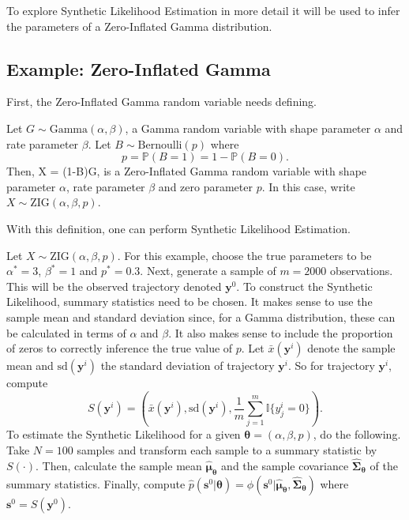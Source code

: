 To explore Synthetic Likelihood Estimation in more detail it will be used to infer the parameters of a Zero-Inflated Gamma distribution.

\subsection{Example: Zero-Inflated Gamma}
\label{subsec:gamma}

First, the Zero-Inflated Gamma random variable needs defining.

\begin{definition}
    Let $G \sim \text{Gamma}(\alpha, \beta)$, a Gamma random variable with shape parameter $\alpha$ and rate parameter $\beta$. Let $B \sim \text{Bernoulli}(p)$ where
    \[ p = \mathbb{P}(B = 1) = 1 - \mathbb{P}(B = 0). \]
    Then, X = (1-B)G, is a Zero-Inflated Gamma random variable with shape parameter $\alpha$, rate parameter $\beta$ and zero parameter $p$. In this case, write $X \sim \text{ZIG}(\alpha, \beta, p)$.
\end{definition}

With this definition, one can perform Synthetic Likelihood Estimation.

Let $X \sim \text{ZIG}(\alpha, \beta, p)$. For this example, choose the true parameters to be $\alpha^* = 3$, $\beta^* = 1$ and $p^* = 0.3$. Next, generate a sample of $m = 2000$ observations. This will be the observed trajectory denoted $\pmb{y}^0$. To construct the Synthetic Likelihood, summary statistics need to be chosen. It makes sense to use the sample mean and standard deviation since, for a Gamma distribution, these can be calculated in terms of $\alpha$ and $\beta$. It also makes sense to include the proportion of zeros to correctly inference the true value of $p$. Let $\bar{x}(\pmb{y}^i)$ denote the sample mean and $\text{sd}(\pmb{y}^i)$ the standard deviation of trajectory $\pmb{y}^i$. So for trajectory $\pmb{y}^i$, compute
\begin{equation}
S(\pmb{y}^i) = (\bar{x}(\pmb{y}^i), \text{sd}(\pmb{y}^i), \frac{1}{m}\sum_{j=1}^m \mathbb{I}\{y^i_j = 0\}).
\end{equation}
To estimate the Synthetic Likelihood for a given $\pmb{\theta} = (\alpha, \beta, p)$, do the following. Take $N=100$ samples and transform each sample to a summary statistic by $S(\cdot)$. Then, calculate the sample mean $\hat{\pmb{\mu}}_{\pmb{\theta}}$ and the sample covariance $\hat{\pmb{\Sigma}}_{\pmb{\theta}}$ of the summary statistics. Finally, compute $\hat{p}(\pmb{s}^0 | \pmb{\theta}) = \phi(\pmb{s}^0 | \hat{\pmb{\mu}}_{\pmb{\theta}}, \hat{\pmb{\Sigma}}_{\pmb{\theta}})$ where $\pmb{s}^0 = S(\pmb{y}^0)$.

